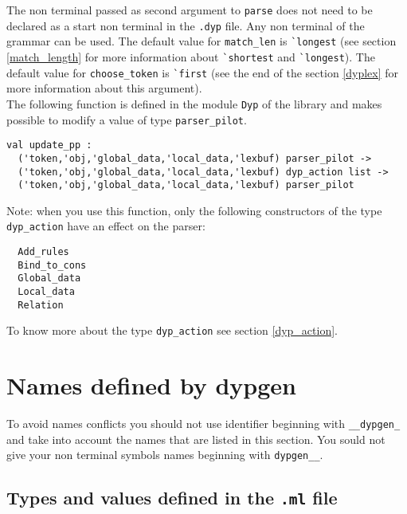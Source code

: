 \documentclass[12pt]{article}
\begin{document}
{The non terminal passed as second argument to \verb|parse| does not need to be declared as a start non terminal in the \verb|.dyp| file. Any non terminal of the grammar can be used. The default value for \verb|match_len| is \verb|`longest| (see section \ref{match_length} for more information about  \verb|`shortest| and \verb|`longest|). The default value for \verb|choose_token| is \verb|`first| (see the end of the section \ref{dyplex} for more information about this argument).\\

The following function is defined in the module \verb|Dyp| of the library and makes possible to modify a value of type \verb|parser_pilot|.
\begin{verbatim}
val update_pp :
  ('token,'obj,'global_data,'local_data,'lexbuf) parser_pilot ->
  ('token,'obj,'global_data,'local_data,'lexbuf) dyp_action list ->
  ('token,'obj,'global_data,'local_data,'lexbuf) parser_pilot
\end{verbatim}
Note: when you use this function, only the following constructors of the type \verb|dyp_action| have an effect on the parser:
\begin{verbatim}
  Add_rules
  Bind_to_cons
  Global_data
  Local_data
  Relation
\end{verbatim}
To know more about the type \verb|dyp_action| see section \ref{dyp_action}.

\section{Names defined by dypgen}

To avoid names conflicts you should not use identifier beginning with \verb|__dypgen_| and take into account the names that are listed in this section. You sould not give your non terminal symbols names beginning with \verb|dypgen__|.\\

\subsection{Types and values defined in the \texttt{.ml} file}

}
\end{document}
